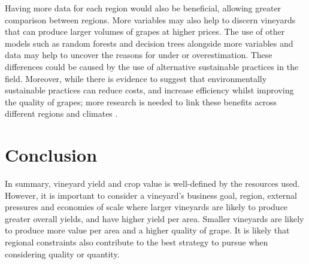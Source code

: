 \documentclass[review,12pt,authoryear]{elsarticle}
\begin{document}
\begin{linenumbers}
\par
Having more data for each region would also be beneficial, allowing greater comparison between regions. More variables may also help to discern vineyards that can produce larger volumes of grapes at higher prices. The use of other models such as random forests and decision trees alongside more variables and data may help to uncover the reasons for under or overestimation. These differences could be caused by the use of alternative sustainable practices in the field. Moreover, while there is evidence to suggest that environmentally sustainable practices can reduce costs, and increase efficiency whilst improving the quality of grapes; more research is needed to link these benefits across different regions and climates \citep{baianoOverviewSustainabilityWine2021,marianiSustainableWinegrowingCurrent2015,montalvo-falconSustainabilityResearchWine2023}.
\section{Conclusion}
In summary, vineyard yield and crop value is well-defined by the resources used. However, it is important to consider a vineyard's business goal, region, external pressures and economies of scale where larger vineyards are likely to produce greater overall yields, and have higher yield per area. Smaller vineyards are likely to produce more value per area and a higher quality of grape. It is likely that regional constraints also contribute to the best strategy to pursue when considering quality or quantity.




 \appendix


\end{linenumbers}
\end{document}
